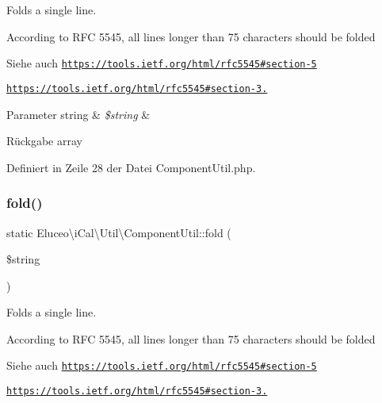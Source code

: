 Folds a single line.

According to R\+FC 5545, all lines longer than 75 characters should be folded

\begin{DoxySeeAlso}{Siehe auch}
\href{https://tools.ietf.org/html/rfc5545#section-5}{\tt https\+://tools.\+ietf.\+org/html/rfc5545\#section-\/5} 

\href{https://tools.ietf.org/html/rfc5545#section-3.1}{\tt https\+://tools.\+ietf.\+org/html/rfc5545\#section-\/3.}
\end{DoxySeeAlso}

\begin{DoxyParams}[1]{Parameter}
string & {\em \$string} & \\
\hline
\end{DoxyParams}
\begin{DoxyReturn}{Rückgabe}
array 
\end{DoxyReturn}


Definiert in Zeile 28 der Datei Component\+Util.\+php.

\mbox{\label{class_eluceo_1_1i_cal_1_1_util_1_1_component_util_a8b295bedfc690ba2f52a884f52726d22}} 
\subsubsection{\texorpdfstring{fold()}{fold()}\hspace{0.1cm}{\footnotesize\ttfamily [2/3]}}
{\footnotesize\ttfamily static Eluceo\textbackslash{}i\+Cal\textbackslash{}\+Util\textbackslash{}\+Component\+Util\+::fold (\begin{DoxyParamCaption}\item[{}]{\$string }\end{DoxyParamCaption})\hspace{0.3cm}{\ttfamily [static]}}

Folds a single line.

According to R\+FC 5545, all lines longer than 75 characters should be folded

\begin{DoxySeeAlso}{Siehe auch}
\href{https://tools.ietf.org/html/rfc5545#section-5}{\tt https\+://tools.\+ietf.\+org/html/rfc5545\#section-\/5} 

\href{https://tools.ietf.org/html/rfc5545#section-3.1}{\tt https\+://tools.\+ietf.\+org/html/rfc5545\#section-\/3.}
\end{DoxySeeAlso}

